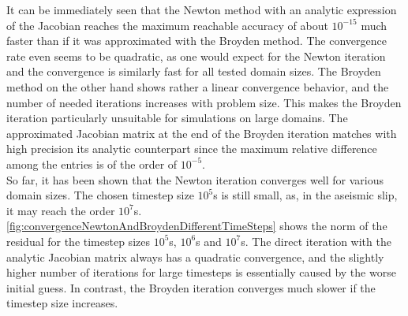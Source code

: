 It can be immediately seen that the Newton method with an analytic expression of the Jacobian reaches the maximum reachable accuracy of about $10^{-15}$ much faster than if it was approximated with the Broyden method. The convergence rate even seems to be quadratic, as one would expect for the Newton iteration and the convergence is similarly fast for all tested domain sizes. The Broyden method on the other hand shows rather a linear convergence behavior, and the number of needed iterations increases with problem size. This makes the Broyden iteration particularly unsuitable for simulations on large domains. The approximated Jacobian matrix at the end of the Broyden iteration matches with high precision its analytic counterpart since the maximum relative difference among the entries is of the order of $10^{-5}$. \\
So far, it has been shown that the Newton iteration converges well for various domain sizes. The chosen timestep size $10^5$s is still small, as, in the aseismic slip, it may reach the order $10^7$s. \autoref{fig:convergenceNewtonAndBroydenDifferentTimeSteps} shows the norm of the residual for the timestep sizes $10^5$s, $10^6$s and $10^7$s. The direct iteration with the analytic Jacobian matrix always has a quadratic convergence, and the slightly higher number of iterations for large timesteps is essentially caused by the worse initial guess. In contrast, the Broyden iteration converges much slower if the timestep size increases. 
